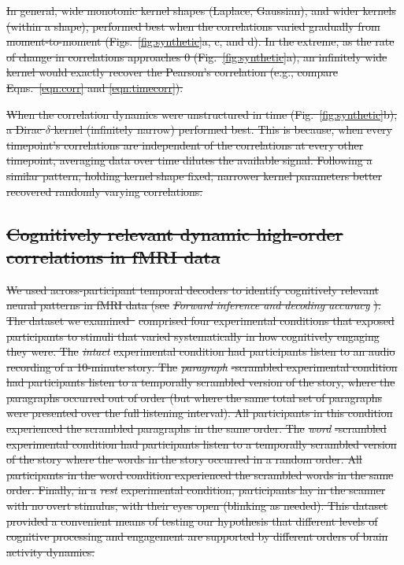\documentclass[english]{article}
\providecommand{\DIFdeltex}[1]{{\protect\color{red}\sout{#1}}}                      %
\providecommand{\DIFdel}[1]{\texorpdfstring{\DIFdeltex{#1}}{}} %
\begin{document}
\DIFdel{In general, wide monotonic kernel shapes (Laplace, Gaussian), and
wider kernels (within a shape), performed best when the correlations
varied gradually from moment-to-moment (Figs.~\ref{fig:synthetic}a, c,
and d).  In the extreme, as the rate of change in correlations
approaches 0 (Fig.~\ref{fig:synthetic}a), an infinitely wide kernel
would exactly recover the Pearson's correlation (e.g., compare
Eqns.~\ref{eqn:corr} and \ref{eqn:timecorr}).
}%

\DIFdel{When the correlation dynamics were unstructured in time
(Fig.~\ref{fig:synthetic}b), a Dirac $\delta$ kernel (infinitely
narrow) performed best.  This is because, when every timepoint's
correlations are independent of the correlations at every other
timepoint, averaging data over time dilutes the available signal.
Following a similar pattern, holding kernel shape fixed, narrower
kernel parameters better recovered randomly varying correlations.
}%

\subsection*{\DIFdel{Cognitively relevant dynamic high-order correlations in
  fMRI data}}
\DIFdel{We used across-participant temporal decoders to identify cognitively
relevant neural patterns in fMRI data (see }\textit{\DIFdel{Forward inference
  and decoding accuracy}}%
\DIFdel{).  The dataset we examined~}%
\DIFdel{comprised four experimental conditions that exposed
participants to stimuli that varied systematically in how cognitively
engaging they were.  The }\textit{\DIFdel{intact}} %
\DIFdel{experimental condition had
participants listen to an audio recording of a 10-minute story.  The
}\textit{\DIFdel{paragraph}}%
\DIFdel{-scrambled experimental condition had participants
listen to a temporally scrambled version of the story, where the
paragraphs occurred out of order (but where the same total set of
paragraphs were presented over the full listening interval).  All
participants in this condition experienced the scrambled paragraphs in
the same order.  The }\textit{\DIFdel{word}}%
\DIFdel{-scrambled experimental condition
had participants listen to a temporally scrambled version of the story
where the words in the story occurred in a random order.  All
participants in the word condition experienced the scrambled words in
the same order.  Finally, in a }\textit{\DIFdel{rest}} %
\DIFdel{experimental condition,
participants lay in the scanner with no overt stimulus, with their
eyes open (blinking as needed).  This dataset provided a convenient
means of testing our hypothesis that different levels of cognitive
processing and engagement are supported by different orders of brain
activity dynamics.
}%
\end{document}
